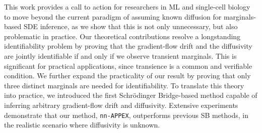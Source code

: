 \documentclass[twoside]{article}
\newcommand{\nappex}{\texttt{nn-APPEX}}
\begin{document}
This work provides a call to action for researchers in ML and single-cell biology to move beyond the current paradigm of assuming known diffusion for marginals-based SDE inference, as we show that this is not only unnecessary, but also problematic in practice. Our theoretical contributions resolve a longstanding identifiability problem by proving that the gradient-flow drift and the diffusivity are jointly identifiable if and only if we observe transient marginals. This is significant for practical applications, since transience is a common and verifiable condition. We further expand the practicality of our result by proving that only three distinct marginals are needed for identifiability. To translate this theory into practice, we introduced the first Schr\"odinger Bridge-based method capable of inferring arbitrary gradient-flow drift and diffusivity. Extensive experiments demonstrate that our method, \nappex, outperforms previous SB methods, in the realistic scenario where diffusivity is unknown.

\end{document}
